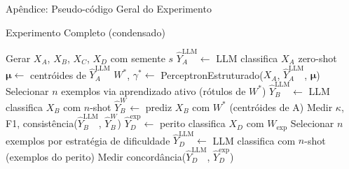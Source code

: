 \documentclass[aspectratio=169, 8pt]{beamer}
\begin{document}
\begin{frame}{Apêndice: Pseudo-código Geral do Experimento}
  \begin{block}{Experimento Completo (condensado)}
    \begin{algorithmic}[1]
      \scriptsize
        \State Gerar $X_A$, $X_B$, $X_C$, $X_D$ com semente $s$
          \State $\hat{Y}^{\text{LLM}}_A \leftarrow$ LLM classifica $X_A$ zero-shot
          \State $\boldsymbol{\mu} \leftarrow$ centróides de $\hat{Y}^{\text{LLM}}_A$
          \State $W^*$, $\gamma^* \leftarrow$ PerceptronEstruturado($X_A$,
            $\hat{Y}^{\text{LLM}}_A$, $\boldsymbol{\mu}$) 
            \State Selecionar $n$ exemplos via aprendizado ativo (rótulos de $W^*$)
            \State $\hat{Y}^{\text{LLM}}_B \leftarrow$ LLM classifica $X_B$ com $n$-shot
            \State $\hat{Y}^{W}_B \leftarrow$ prediz $X_B$ com $W^*$ (centróides de A)
            \State Medir $\kappa$, F1, consistência($\hat{Y}^{\text{LLM}}_B$,
              $\hat{Y}^W_B$) 
          \EndFor
        \EndFor
          \State $\hat{Y}^{\text{exp}}_D \leftarrow$ perito classifica $X_D$ com $W_{\text{exp}}$
          \State Selecionar $n$ exemplos por estratégia de dificuldade
          \State $\hat{Y}^{\text{LLM}}_D \leftarrow$ LLM classifica com $n$-shot (exemplos do perito)
          \State Medir concordância($\hat{Y}^{\text{LLM}}_D$, $\hat{Y}^{\text{exp}}_D$)
        \EndFor
      \EndFor
    \end{algorithmic}
  \end{block}
\end{frame}
\end{document}

